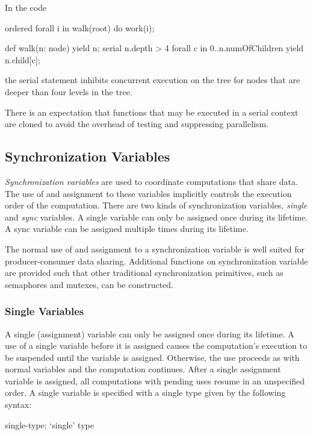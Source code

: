 \begin{example}
In the code
\begin{chapel}
ordered forall i in walk(root) do
  work(i);

def walk(n: node) {
  yield n;
  serial n.depth > 4 forall c in 0..n.numOfChildren {
      yield n.child[c];
  }
}
\end{chapel}
the serial statement inhibits concurrent execution on the tree for
nodes that are deeper than four levels in the tree.
\end{example}

There is an expectation that functions that may be executed in a
serial context are cloned to avoid the overhead of testing and
suppressing parallelism.

\subsection{Synchronization Variables}
\label{Synchronization_Variables}

{\em Synchronization variables} are used to coordinate computations
that share data.  The use of and assignment to these variables
implicitly controls the execution order of the computation.  There are
two kinds of synchronization variables, {\em single} and {\em sync}
variables.  A single variable can only be assigned once during its
lifetime.  A sync variable can be assigned multiple times during its
lifetime.

The normal use of and assignment to a synchronization variable is well
suited for producer-consumer data sharing.  Additional functions on
synchronization variable are provided such that other traditional
synchronization primitives, such as semaphores and mutexes, can be
constructed.

\subsubsection{Single Variables}
\label{Single_Variables}

A single (assignment) variable can only be assigned once during its
lifetime.  A use of a single variable before it is assigned causes the
computation's execution to be suspended until the variable is
assigned. Otherwise, the use proceeds as with normal variables and the
computation continues.  After a single assignment variable is assigned,
all computations with pending uses resume in an unspecified order.  A
single variable is specified with a single type given by the following
syntax:
\begin{syntax}
 single-type:
   `single' type
\end{syntax}

